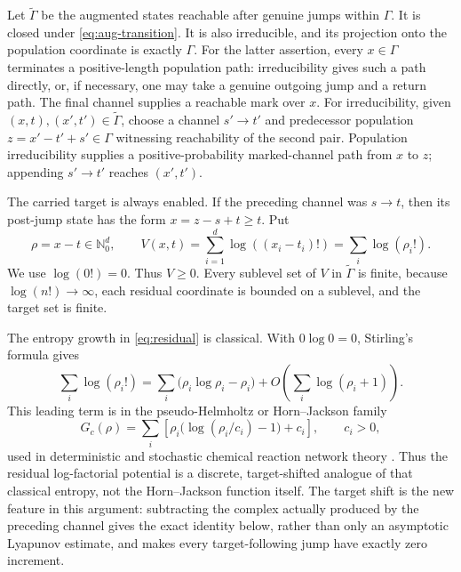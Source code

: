 Let \(\widetilde\Gamma\) be the augmented states reachable after genuine
jumps within \(\Gamma\).  It is closed under \eqref{eq:aug-transition}.  It is
also irreducible, and its projection onto the population coordinate is exactly
\(\Gamma\).  For the latter assertion, every \(x\in\Gamma\) terminates a
positive-length population path: irreducibility gives such a path directly,
or, if necessary, one may take a genuine outgoing jump and a return path.
The final channel supplies a reachable mark over \(x\).  For irreducibility,
given \((x,t),(x',t')\in\widetilde\Gamma\), choose
a channel \(s'\to t'\) and predecessor population
\(z=x'-t'+s'\in\Gamma\) witnessing reachability of the second pair.
Population irreducibility supplies a positive-probability marked-channel path
from \(x\) to \(z\); appending \(s'\to t'\) reaches \((x',t')\).

The carried target is always enabled.  If the preceding channel was
\(s\to t\), then its post-jump state has the form \(x=z-s+t\ge t\).  Put
\begin{equation}\label{eq:residual}
  \rho=x-t\in\mathbb N_0^d,
  \qquad
  V(x,t)=\sum_{i=1}^d\log((x_i-t_i)!)=\sum_i\log(\rho_i!).
\end{equation}
We use \(\log(0!)=0\).  Thus \(V\ge0\).  Every sublevel set of \(V\) in
\(\widetilde\Gamma\) is finite, because \(\log(n!)\to\infty\), each residual
coordinate is bounded on a sublevel, and the target set is finite.

The entropy growth in \eqref{eq:residual} is classical.  With
\(0\log0=0\), Stirling's formula gives
\begin{equation}\label{eq:stirling-entropy}
 \sum_i\log(\rho_i!)
 =\sum_i\bigl(\rho_i\log \rho_i-\rho_i\bigr)
  +O\!\left(\sum_i\log(\rho_i+1)\right).
\end{equation}
This leading term is in the pseudo-Helmholtz or Horn--Jackson family
\[
 G_c(\rho)=\sum_i\left[\rho_i\bigl(\log(\rho_i/c_i)-1\bigr)+c_i\right],
 \qquad c_i>0,
\]
used in deterministic and stochastic chemical reaction network theory
\citep{HornJackson1972,AndersonCraciunGopalkrishnanWiuf2015}.  Thus the residual log-factorial
potential is a discrete, target-shifted analogue of that classical entropy,
not the Horn--Jackson function itself.  The target shift is the new feature in
this argument: subtracting the complex actually produced by the preceding
channel gives the exact identity below, rather than only an asymptotic
Lyapunov estimate, and makes every target-following jump have exactly zero
increment.

